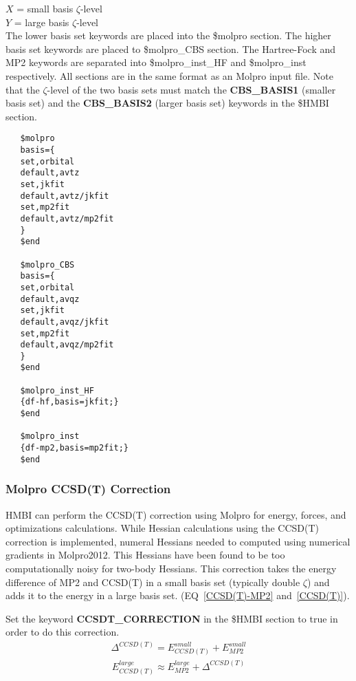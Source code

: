 \documentclass[11pt,letterpaper]{article}
\begin{document}
\begin{spacing}{1.0}
\noindent
$X$ = small basis $\zeta$-level \\
\noindent
$Y$ = large basis $\zeta$-level\\

\noindent
The lower basis set keywords are placed into the \$molpro section. The higher basis set keywords are placed to \$molpro\_CBS section. 
The Hartree-Fock and MP2 keywords are separated into \$molpro\_inst\_HF and \$molpro\_inst respectively. All sections are 
in the same format as an Molpro input file. Note that the $\zeta$-level of 
the two basis sets must match the {\bf CBS\_BASIS1} (smaller basis set) and the
{\bf CBS\_BASIS2} (larger basis set) keywords in the \$HMBI section.

\begin{verbatim}
   $molpro
   basis={
   set,orbital
   default,avtz
   set,jkfit
   default,avtz/jkfit
   set,mp2fit
   default,avtz/mp2fit
   }
   $end

   $molpro_CBS
   basis={
   set,orbital
   default,avqz
   set,jkfit
   default,avqz/jkfit
   set,mp2fit
   default,avqz/mp2fit
   }
   $end

   $molpro_inst_HF
   {df-hf,basis=jkfit;}
   $end

   $molpro_inst
   {df-mp2,basis=mp2fit;}
   $end
\end{verbatim}

\subsubsection{Molpro CCSD(T) Correction}

HMBI can perform the CCSD(T) correction using Molpro for energy, forces, and optimizations calculations.
While Hessian calculations using the CCSD(T) correction is implemented, numeral Hessians needed to computed using numerical 
gradients in Molpro2012. This Hessians have been found to be too computationally noisy for two-body Hessians. This
correction takes the energy difference of MP2 and CCSD(T) in a small basis set (typically double $\zeta$) and 
adds it to the energy in a large basis set. (EQ~\ref{CCSD(T)-MP2} and~\ref{CCSD(T)}). 

Set the keyword {\bf CCSDT\_CORRECTION} in the \$HMBI section to true in order to do this correction. 
\begin{eqnarray}
\label{CCSD(T)-MP2}
\Delta^{CCSD(T)} = E_{CCSD(T)}^{small} + E_{MP2}^{small} 
\end{eqnarray}
\begin{eqnarray}
\label{CCSD(T)}
E_{CCSD(T)}^{large} \approx E_{MP2}^{large} + \Delta^{CCSD(T)}
\end{eqnarray}


\end{spacing}
\end{document}
